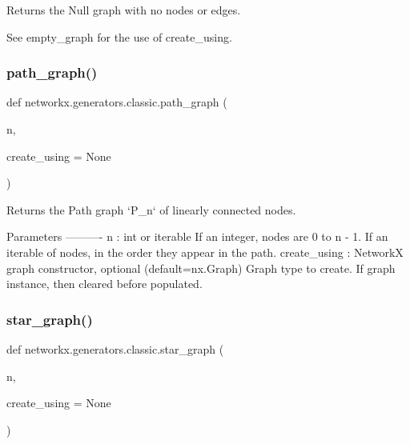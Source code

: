\begin{DoxyVerb}Returns the Null graph with no nodes or edges.

See empty_graph for the use of create_using.\end{DoxyVerb}
 \mbox{\label{namespacenetworkx_1_1generators_1_1classic_a52398ee63be385cd34c1a1cd523401b7}} 
\subsubsection{\texorpdfstring{path\+\_\+graph()}{path\_graph()}}
{\footnotesize\ttfamily def networkx.\+generators.\+classic.\+path\+\_\+graph (\begin{DoxyParamCaption}\item[{}]{n,  }\item[{}]{create\+\_\+using = {\ttfamily None} }\end{DoxyParamCaption})}

\begin{DoxyVerb}Returns the Path graph `P_n` of linearly connected nodes.

Parameters
----------
n : int or iterable
    If an integer, nodes are 0 to n - 1.
    If an iterable of nodes, in the order they appear in the path.
create_using : NetworkX graph constructor, optional (default=nx.Graph)
   Graph type to create. If graph instance, then cleared before populated.\end{DoxyVerb}
 \mbox{\label{namespacenetworkx_1_1generators_1_1classic_a9922d057a8798f8b8856665f3effb75a}} 
\subsubsection{\texorpdfstring{star\+\_\+graph()}{star\_graph()}}
{\footnotesize\ttfamily def networkx.\+generators.\+classic.\+star\+\_\+graph (\begin{DoxyParamCaption}\item[{}]{n,  }\item[{}]{create\+\_\+using = {\ttfamily None} }\end{DoxyParamCaption})}

